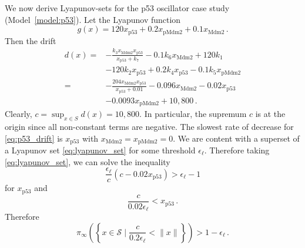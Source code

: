 We now derive Lyapunov-sets for the p53 oscillator case study (Model~\ref{model:p53}). Let the Lyapunov function
\begin{equation}
    g(x) = 120 x_{\mathrm{p53}} + 0.2 x_{\mathrm{pMdm2}} + 0.1 x_{\mathrm{Mdm2}}\,.
\end{equation}
Then the drift
\begin{equation}\label{eq:p53_drift}
\begin{split}
    d(x) = & - \frac{k_3 x_{\mathrm{Mdm2}} x_{\mathrm{p53}}}{x_{\mathrm{p53}} + k_7}
            - 0.1 k_6 x_{\mathrm{Mdm2}}
            + 120 k_1 \\
          & - 120 k_2 x_{\mathrm{p53}}
            + 0.2 k_4 x_{\mathrm{p53}}
            - 0.1 k_5 x_{\mathrm{pMdm2}}  \\
        = & - \frac{204 x_{\mathrm{Mdm2}} x_{\mathrm{p53}}}{x_{\mathrm{p53}} + 0.01}
            - 0.096 x_{\mathrm{Mdm2}}
            - 0.02 x_{\mathrm{p53}} \\
            &- 0.0093 x_{\mathrm{pMdm2}}
            + 10,800\,. 
\end{split}
\end{equation}
Clearly, $c = \sup_{x\in{S}} d(x) = 10,800$.
In particular, the supremum $c$ is at the origin since all non-constant terms are negative.
The slowest rate of decrease for \eqref{eq:p53_drift} is $x_{\mathrm{p53}}$ with $x_{\mathrm{Mdm2}} = x_{\mathrm{pMdm2}} = 0$.
We are content with a superset of a Lyapunov set \eqref{eq:lyapunov_set} for some threshold $\epsilon_{\ell}$.
Therefore taking \eqref{eq:lyapunov_set}, we can solve the inequality
\[
\frac{\epsilon_{\ell}}{c}(c - 0.02 x_{\mathrm{p53}}) > \epsilon_{\ell} - 1
\]
for $x_{\mathrm{p53}}$ and 
\begin{equation*}
    \frac{c}{0.02 \epsilon_{\ell}} < x_{\mathrm{p53}}\,.
\end{equation*}
Therefore
\begin{equation*}
\pi_{\infty}\left(\left\{x\in\mathcal{S} \mid \frac{c}{0.2\epsilon_{\ell}} < \lVert x \rVert \right\}\right) > 1 - \epsilon_{\ell}\,.
\end{equation*}

